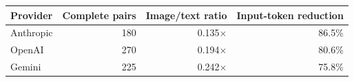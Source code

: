 \begin{tabular}{lrrr}
\toprule
Provider & Complete pairs & Image/text ratio & Input-token reduction \\
\midrule
Anthropic & 180 & 0.135$\times$ & 86.5\% \\
OpenAI & 270 & 0.194$\times$ & 80.6\% \\
Gemini & 225 & 0.242$\times$ & 75.8\% \\
\bottomrule
\end{tabular}
